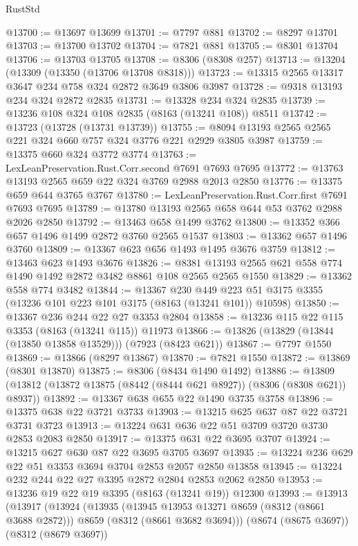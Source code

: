 \begin{lexlean}{RustStd}
\begin{coremodule}
@13700 := @13697 @13699
@13701 := @7797 @881
@13702 := @8297 @13701
@13703 := @13700 @13702
@13704 := @7821 @881
@13705 := @8301 @13704
@13706 := @13703 @13705
@13708 := @8306 (@8308 @257)
@13713 := @13204 (@13309 (@13350 (@13706 @13708 @8318)))
@13723 := @13315 @2565 @13317 @3647 @234 @758 @324 @2872 @3649 @3806 @3987
@13728 := @9318 @13193 @234 @324 @2872 @2835
@13731 := @13328 @234 @324 @2835
@13739 := @13236 @108 @324 @108 @2835 (@8163 (@13241 @108)) @8511
@13742 := @13723 (@13728 (@13731 @13739))
@13755 := @8094 @13193 @2565 @2565 @221 @324 @660 @757 @324 @3776 @221 @2929 @3805 @3987
@13759 := @13375 @660 @324 @3772 @3774
@13763 := LexLeanPreservation.Rust.Corr.second @7691 @7693 @7695
@13772 := @13763 @13193 @2565 @659 @22 @324 @3769 @2988 @2013 @2850
@13776 := @13375 @659 @644 @3765 @3767
@13780 := LexLeanPreservation.Rust.Corr.first @7691 @7693 @7695
@13789 := @13780 @13193 @2565 @658 @644 @53 @3762 @2988 @2026 @2850
@13792 := @13463 @658 @1499 @3762
@13800 := @13352 @366 @657 @1496 @1499 @2872 @3760 @2565 @1537
@13803 := @13362 @657 @1496 @3760
@13809 := @13367 @623 @656 @1493 @1495 @3676 @3759
@13812 := @13463 @623 @1493 @3676
@13826 := @8381 @13193 @2565 @621 @558 @774 @1490 @1492 @2872 @3482 @8861 @108 @2565 @2565 @1550
@13829 := @13362 @558 @774 @3482
@13844 := @13367
    @230
    @449
    @223
    @51
    @3175
    @3355
    (@13236 @101 @223 @101 @3175 (@8163 (@13241 @101)) @10598)
@13850 := @13367 @236 @244 @22 @27 @3353 @2804
@13858 := @13236 @115 @22 @115 @3353 (@8163 (@13241 @115)) @11973
@13866 := @13826 (@13829 (@13844 (@13850 @13858 @13529))) (@7923 (@8423 @621))
@13867 := @7797 @1550
@13869 := @13866 (@8297 @13867)
@13870 := @7821 @1550
@13872 := @13869 (@8301 @13870)
@13875 := @8306 (@8434 @1490 @1492)
@13886 := @13809 (@13812 (@13872 @13875 (@8442 (@8444 @621 @8927)) (@8306 (@8308 @621)) @8937))
@13892 := @13367 @638 @655 @22 @1490 @3735 @3758
@13896 := @13375 @638 @22 @3721 @3733
@13903 := @13215 @625 @637 @87 @22 @3721 @3731 @3723
@13913 := @13224 @631 @636 @22 @51 @3709 @3720 @3730 @2853 @2083 @2850
@13917 := @13375 @631 @22 @3695 @3707
@13924 := @13215 @627 @630 @87 @22 @3695 @3705 @3697
@13935 := @13224 @236 @629 @22 @51 @3353 @3694 @3704 @2853 @2057 @2850 @13858
@13945 := @13224 @232 @244 @22 @27 @3395 @2872 @2804 @2853 @2062 @2850
@13953 := @13236 @19 @22 @19 @3395 (@8163 (@13241 @19)) @12300
@13993 := @13913
    (@13917
      (@13924
        (@13935
          (@13945 @13953 @13271 @8659 (@8312 (@8661 @3688 @2872)))
          @8659
          (@8312 (@8661 @3682 @3694)))
        (@8674 (@8675 @3697))
        (@8312 (@8679 @3697))

\end{coremodule}
\end{lexlean}

